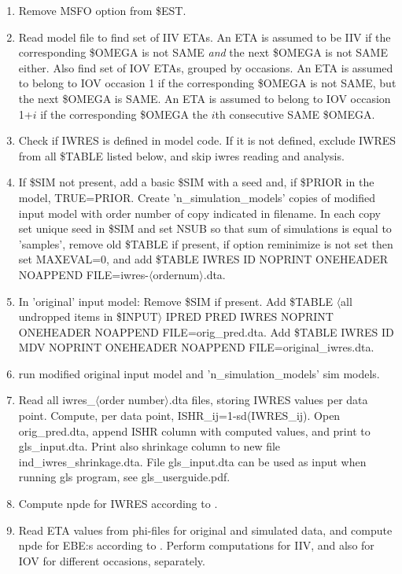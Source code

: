\begin{enumerate}
\item Remove MSFO option from \$EST.
\item Read model file to find set of IIV ETAs. An ETA is assumed to be IIV if the
corresponding \$OMEGA is not SAME
\emph{and} the next \$OMEGA is not SAME either. Also find set of IOV ETAs, grouped by occasions.
An ETA is assumed to belong to IOV occasion 1 if the corresponding \$OMEGA is not SAME,
but the next \$OMEGA is SAME. 
An ETA is assumed to belong to IOV occasion 1+$i$ if the corresponding \$OMEGA the $i$th consecutive SAME \$OMEGA.
\item Check if IWRES is defined in model code. If it is not defined, exclude
IWRES from all \$TABLE listed below, and skip iwres reading and analysis.
\item If \$SIM not present, add a basic \$SIM with a seed and, if \$PRIOR in the model, TRUE=PRIOR.
Create 'n\_simulation\_models' copies of modified
input model with order number of copy indicated in filename. In each copy set unique
seed in \$SIM and set
NSUB so that sum of simulations is equal to 'samples', remove old \$TABLE if present, 
if option reminimize is not set then set MAXEVAL=0, and
add \$TABLE IWRES ID NOPRINT ONEHEADER NOAPPEND FILE=iwres-$\langle$ordernum$\rangle$.dta. 
\item In 'original' input model:
Remove \$SIM if present.
Add \$TABLE $\langle$all undropped items in
\$INPUT$\rangle$ IPRED PRED IWRES NOPRINT ONEHEADER NOAPPEND FILE=orig\_pred.dta.
Add \$TABLE IWRES ID MDV NOPRINT ONEHEADER NOAPPEND FILE=original\_iwres.dta. 
\item run modified original input model and 'n\_simulation\_models' sim models.
\item Read all iwres\_$\langle$order number$\rangle$.dta files,
storing IWRES values per data point. Compute, per data point, ISHR\_ij=1-sd(IWRES\_ij).
Open orig\_pred.dta, append ISHR column with
computed values,
and print to gls\_input.dta. Print also shrinkage column to new file ind\_iwres\_shrinkage.dta. File gls\_input.dta
can be used as input when running gls program, see gls\_userguide.pdf. 
\item Compute npde for IWRES according to \cite{Comets}.
\item Read ETA values from 
phi-files for original and simulated data, and compute npde for EBE:s according to \cite{Comets}.
Perform computations for IIV, and also for IOV for different occasions, separately. 
\end{enumerate}

